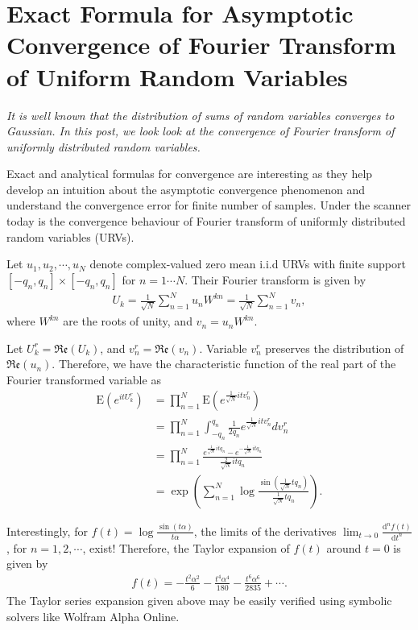\section{Exact Formula for Asymptotic Convergence of Fourier Transform of Uniform Random Variables}

\emph{It is well known that the distribution of sums of random variables converges to Gaussian. In this post, we look look at the convergence of Fourier transform of uniformly distributed random variables.}

Exact and analytical formulas for convergence are interesting as they help develop an intuition about the asymptotic convergence phenomenon and understand the convergence error for finite number  of samples. Under the scanner today is the convergence behaviour of Fourier transform of uniformly distributed random variables (URVs). 

Let $u_1, u_2, \cdots, u_N$ denote complex-valued zero mean i.i.d URVs with finite support $[-q_n, q_n]\times [-q_n, q_n]$ for $n = 1\cdots N$. Their Fourier transform is given by
\begin{align}U_k = \frac{1}{\sqrt{N}} \sum_{n = 1}^{N} u_n W^{kn} = \frac{1}{\sqrt{N}} \sum_{n = 1}^{N} v_n,\end{align}
where $W^{kn}$ are the roots of unity, and $v_n = u_n W^{kn}$.

Let $U^r_k = \mathfrak{Re}(U_k)$, and $v^r_n = \mathfrak{Re}(v_n)$. Variable $v^r_n$ preserves the distribution of $\mathfrak{Re}(u_n)$. Therefore, we have the characteristic function of the real part of the Fourier transformed variable as
\begin{align}\text{E}(e^{itU_k^r}) &= \prod_{n = 1}^{N} \text{E}(e^{\frac{1}{\sqrt{N}}it v^r_n})\nonumber \\ &= \prod_{n = 1}^{N} \int_{-q_n}^{q_n} \frac{1}{2q_n} e^{\frac{1}{\sqrt{N}}it v^r_n} dv^r_n \nonumber\\ &= \prod_{n = 1}^{N} \frac{e^{\frac{1}{\sqrt{N}}itq_n} - e^{-\frac{1}{\sqrt{N}}itq_n}}{\frac{2}{\sqrt{N}}itq_n} \nonumber\\ &= \exp\left( \sum_{n = 1}^{N} \log \frac{\sin\left(\frac{1}{\sqrt{N}}tq_n\right)}{\frac{1}{\sqrt{N}}tq_n}\right).\end{align}

Interestingly, for $f(t) = \log \frac{\sin(t\alpha)}{t\alpha}$, the limits of the derivatives $\lim_{t\to 0} \frac{\text{d}^n f(t)}{\text{d}t^n}$, for $n = 1, 2, \cdots$, exist! Therefore, the Taylor expansion of $f(t)$ around $t=0$ is given by
\begin{align}f(t) = -\frac{t^2\alpha^2}{6} - \frac{t^4\alpha^4}{180} - \frac{t^6\alpha^6}{2835} + \cdots.\end{align}
The Taylor series expansion given above may be easily verified using symbolic solvers like Wolfram Alpha Online.

